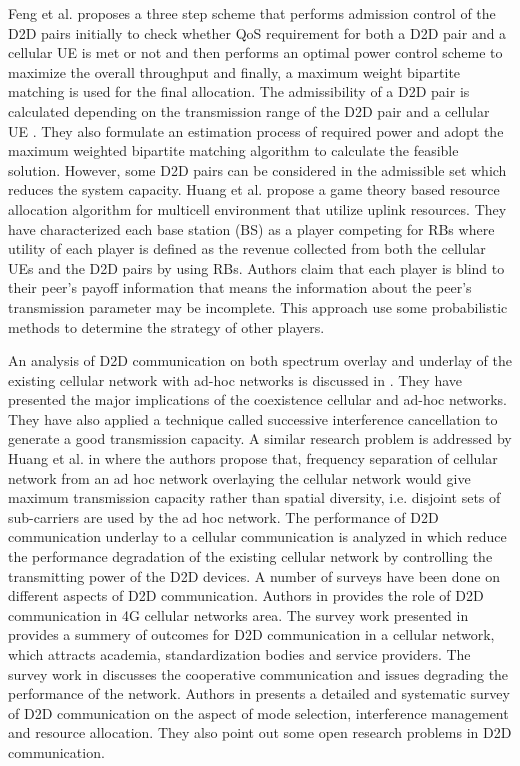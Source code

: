 \documentclass[times]{dacauth}
\begin{document}
\noindent
Feng et al. \cite{feng} proposes a three step scheme that performs admission control of the D2D pairs initially to check whether QoS requirement for both a D2D pair and a cellular UE is met or not and then performs an optimal power control scheme to maximize the overall throughput and finally, a maximum weight bipartite matching is used for the final allocation. The admissibility of a D2D pair is calculated depending on the transmission range of the D2D pair and a cellular UE . They also formulate an estimation process of required power and adopt the maximum weighted bipartite matching algorithm to calculate the feasible solution. However, some D2D pairs can be considered in the admissible set which reduces the system capacity. Huang et al. \cite{huang_game} propose a game theory based resource allocation algorithm for multicell environment that utilize uplink resources. They have characterized each base station (BS) as a player competing for RBs where utility of each player is defined as the revenue collected from both the cellular UEs and the D2D pairs by using RBs. Authors claim that each player is blind to their peer's payoff information that means the information about the peer's transmission parameter may be incomplete. This approach use some probabilistic methods to determine the strategy of other players.

\smallskip
\noindent
An analysis of D2D communication on both spectrum overlay and underlay of the existing cellular network with ad-hoc networks is discussed in \cite{huang}. They have presented the major implications of the coexistence cellular and ad-hoc networks. They have also applied a technique called successive interference cancellation to generate a good transmission capacity. A similar research problem is addressed by Huang et al. in \cite{overlaid} where the authors propose that, frequency separation of cellular network from an ad hoc network overlaying the cellular network would give maximum transmission capacity rather than spatial diversity, i.e. disjoint sets of sub-carriers are used by the ad hoc network. The performance of D2D communication underlay to a cellular communication is analyzed in \cite{yu} which reduce the performance degradation of the existing cellular network by controlling the transmitting power of the D2D devices. A number of surveys have been done on different aspects of D2D communication. Authors in \cite{asadi2014survey} provides the role of D2D communication in 4G cellular networks area. The survey work presented in \cite{liu2015device} provides a summery of outcomes for D2D communication in a cellular network, which attracts academia, standardization bodies and service providers. The survey work in \cite{alkurd2014survey} discusses the cooperative communication and issues degrading the performance of the network. Authors in \cite{ali2016} presents a detailed and systematic survey of D2D communication on the aspect of mode selection, interference management and resource allocation. They also point out some open research problems in D2D communication.
\end{document}
